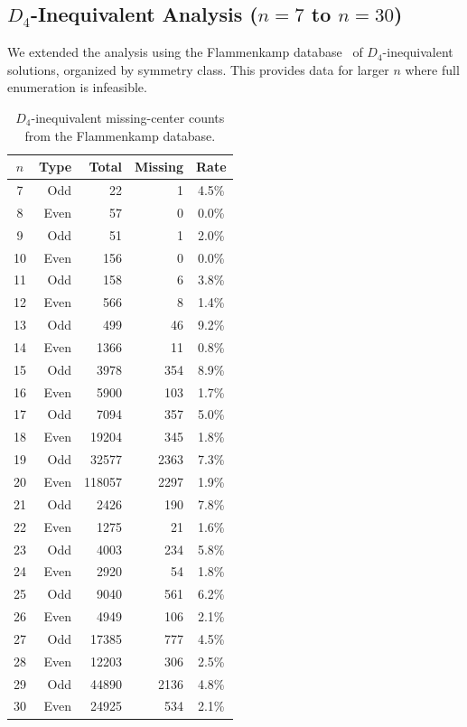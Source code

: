 \documentclass[11pt,a4paper]{article}
\theoremstyle{plain}
\theoremstyle{definition}
\begin{document}
\subsection{$D_4$-Inequivalent Analysis ($n=7$ to $n=30$)}

We extended the analysis using the Flammenkamp database~\cite{flammenkamp} of $D_4$-inequivalent solutions, organized by symmetry class. This provides data for larger $n$ where full enumeration is infeasible.

\begin{table}[H]
\centering
\caption{$D_4$-inequivalent missing-center counts from the Flammenkamp database.}
\label{tab:d4}
\footnotesize
\begin{tabular}{crrrc}
\toprule
$n$ & Type & Total & Missing & Rate \\
\midrule
7 & Odd & 22 & 1 & 4.5\%\\
8 & Even & 57 & 0 & 0.0\%\\
9 & Odd & 51 & 1 & 2.0\%\\
10 & Even & 156 & 0 & 0.0\%\\
11 & Odd & 158 & 6 & 3.8\%\\
12 & Even & 566 & 8 & 1.4\%\\
13 & Odd & 499 & 46 & 9.2\%\\
14 & Even & 1366 & 11 & 0.8\%\\
15 & Odd & 3978 & 354 & 8.9\%\\
16 & Even & 5900 & 103 & 1.7\%\\
17 & Odd & 7094 & 357 & 5.0\%\\
18 & Even & 19204 & 345 & 1.8\%\\
19 & Odd & 32577 & 2363 & 7.3\%\\
20 & Even & 118057 & 2297 & 1.9\%\\
21 & Odd & 2426 & 190 & 7.8\%\\
22 & Even & 1275 & 21 & 1.6\%\\
23 & Odd & 4003 & 234 & 5.8\%\\
24 & Even & 2920 & 54 & 1.8\%\\
25 & Odd & 9040 & 561 & 6.2\%\\
26 & Even & 4949 & 106 & 2.1\%\\
27 & Odd & 17385 & 777 & 4.5\%\\
28 & Even & 12203 & 306 & 2.5\%\\
29 & Odd & 44890 & 2136 & 4.8\%\\
30 & Even & 24925 & 534 & 2.1\%\\
\bottomrule
\end{tabular}
\end{table}
\end{document}
